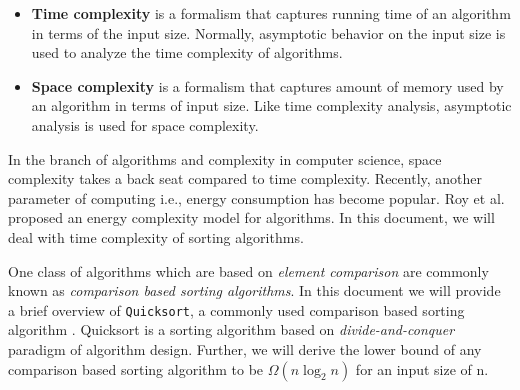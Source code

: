 \documentclass[a4paper, 10pt,twocolumn]{article}
\begin{document}
\begin{itemize}
\item \textbf{Time complexity} is a formalism that captures running time of an algorithm in terms of the input size. Normally, asymptotic behavior on the input size is used to analyze the time complexity of algorithms.
\item \textbf{Space complexity} is a formalism that captures amount of memory used by an algorithm in terms of input size. Like time complexity analysis, asymptotic analysis is used for space complexity.
\end{itemize}
In the branch of algorithms and complexity in computer science, space complexity takes a back seat compared to time complexity. Recently, another parameter of computing i.e., energy consumption has become popular. Roy et al. \cite{roy} proposed an energy complexity model for algorithms. In this document, we will deal with time complexity of sorting algorithms. \par
One class of algorithms which are based on \textit{element comparison} are commonly known as \textit{comparison based sorting algorithms}. In this document we will provide a brief overview of \texttt{Quicksort}, a commonly used comparison based sorting algorithm \cite{hoare}. Quicksort is a sorting algorithm based on \textit{divide-and-conquer} paradigm of algorithm design. Further, we will derive the lower bound of any comparison based sorting algorithm to be $\Omega(n\log_{2} n)$ for an input size of n.
\vspace{-2.5mm}
\end{document}
